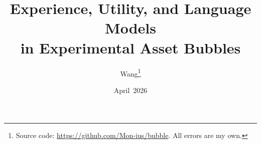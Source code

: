 



\title{\textbf{Experience, Utility, and Language Models\\in Experimental Asset Bubbles}}

\author{Wang\thanks{Source code:
  \url{https://github.com/Mon-ius/bubble}.  All errors are my own.}}

\date{April~2026}


\maketitle









{\footnotesize
\setlength{\bibsep}{2pt plus 0.2ex}


}

\clearpage
\appendix




